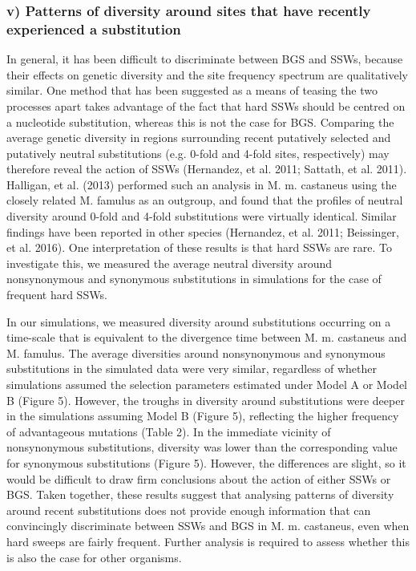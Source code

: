 \subsubsection{v) Patterns of diversity around sites that have recently experienced a substitution}

In general, it has been difficult to discriminate between BGS and SSWs, because their effects on genetic diversity and the site frequency spectrum are qualitatively similar. One method that has been suggested as a means of teasing the two processes apart takes advantage of the fact that hard SSWs should be centred on a nucleotide substitution, whereas this is not the case for BGS. Comparing the average genetic diversity in regions surrounding recent putatively selected and putatively neutral substitutions (e.g. 0-fold and 4-fold sites, respectively) may therefore reveal the action of SSWs (Hernandez, et al. 2011; Sattath, et al. 2011). Halligan, et al. (2013) performed such an analysis in M. m. castaneus using the closely related M. famulus as an outgroup, and found that the profiles of neutral diversity around 0-fold and 4-fold substitutions were virtually identical. Similar findings have been reported in other species (Hernandez, et al. 2011; Beissinger, et al. 2016). One interpretation of these results is that hard SSWs are rare. To investigate this, we measured the average neutral diversity around nonsynonymous and synonymous substitutions in simulations for the case of frequent hard SSWs.

In our simulations, we measured diversity around substitutions occurring on a time-scale that is equivalent to the divergence time between M. m. castaneus and M. famulus. The average diversities around nonsynonymous and synonymous substitutions in the simulated data were very similar, regardless of whether simulations assumed the selection parameters estimated under Model A or Model B (Figure 5). However, the troughs in diversity around substitutions were deeper in the simulations assuming Model B (Figure 5), reflecting the higher frequency of advantageous mutations (Table 2). In the immediate vicinity of nonsynonymous substitutions, diversity was lower than the corresponding value for synonymous substitutions (Figure 5). However, the differences are slight, so it would be difficult to draw firm conclusions about the action of either SSWs or BGS. Taken together, these results suggest that analysing patterns of diversity around recent substitutions does not provide enough information that can convincingly discriminate between SSWs and BGS in M. m. castaneus, even when hard sweeps are fairly frequent. Further analysis is required to assess whether this is also the case for other organisms.

